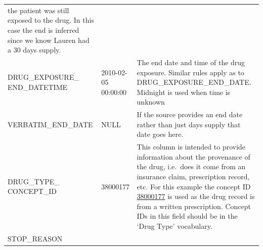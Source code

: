 \documentclass[11pt]{book}
\begin{document}
\begin{longtable}[]{@{}lll@{}}
\begin{minipage}[t]{0.47\columnwidth}
the patient was still exposed to the drug. In this case the end is
inferred since we know Lauren had a 30 days supply.\strut
\end{minipage}\tabularnewline
\begin{minipage}[t]{0.30\columnwidth}\raggedright\strut
DRUG\_EXPOSURE\_ END\_DATETIME\strut
\end{minipage} & \begin{minipage}[t]{0.14\columnwidth}\raggedright\strut
2010-02-05 00:00:00\strut
\end{minipage} & \begin{minipage}[t]{0.47\columnwidth}\raggedright\strut
The end date and time of the drug exposure. Similar rules apply as to
DRUG\_EXPOSURE\_END\_DATE. Midnight is used when time is unknown\strut
\end{minipage}\tabularnewline
\begin{minipage}[t]{0.30\columnwidth}\raggedright\strut
VERBATIM\_END\_DATE\strut
\end{minipage} & \begin{minipage}[t]{0.14\columnwidth}\raggedright\strut
NULL\strut
\end{minipage} & \begin{minipage}[t]{0.47\columnwidth}\raggedright\strut
If the source provides an end date rather than just days supply that
date goes here.\strut
\end{minipage}\tabularnewline
\begin{minipage}[t]{0.30\columnwidth}\raggedright\strut
DRUG\_TYPE\_ CONCEPT\_ID\strut
\end{minipage} & \begin{minipage}[t]{0.14\columnwidth}\raggedright\strut
38000177\strut
\end{minipage} & \begin{minipage}[t]{0.47\columnwidth}\raggedright\strut
This column is intended to provide information about the provenance of
the drug, i.e.~does it come from an insurance claim, prescription
record, etc. For this example the concept ID
\href{http://athena.ohdsi.org/search-terms/terms/38000177}{38000177} is
used as the drug record is from a written prescription. Concept IDs in
this field should be in the `Drug Type' vocabulary.\strut
\end{minipage}\tabularnewline
\begin{minipage}[t]{0.30\columnwidth}\raggedright\strut
STOP\_REASON\strut
\end{minipage} & \begin{minipage}[t]{0.14\columnwidth}\raggedright\strut

\end{minipage}
\end{longtable}
\end{document}
